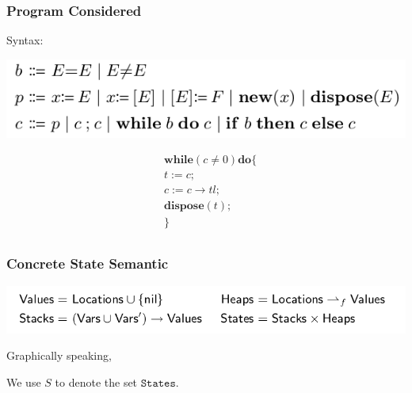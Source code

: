 \documentclass[aspectratio=1610, 13pt]{beamer}
\begin{document}
\begin{frame}[fragile]\frametitle{Program Considered}
Syntax:

\begin{center}
        \includegraphics[scale=0.45]{program.png}
    \end{center}

\begin{example}

\begin{align*}
&\mathbf{while}(c\ne 0)  \mathbf{do}\{\\
&t := c;\\
&c := c\rightarrow tl;\\
&\mathbf{dispose}(t);\\
&\}\\
\end{align*}
\end{example}



\end{frame}
\begin{frame}\frametitle{Concrete State Semantic}
	\begin{center}
        \includegraphics[scale=0.4]{conc_sema.png}
    \end{center}
    Graphically speaking,
    \vspace{10em}
    
    We use $S$ to denote the set $\texttt{States}$.
\end{frame}
\end{document}

